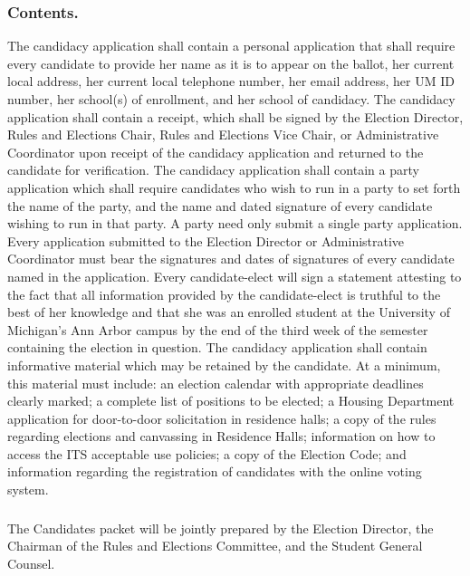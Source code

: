 \subsubsection{Contents.}
The candidacy application shall contain a personal application that shall require every candidate to provide her name as it is to appear on the ballot, her current local address, her current local telephone number, her email address, her UM ID number, her school(s) of enrollment, and her school of candidacy. 
The candidacy application shall contain a receipt, which shall be signed by the Election Director, Rules and Elections Chair, Rules and Elections Vice Chair, or Administrative Coordinator upon receipt of the candidacy application and returned to the candidate for verification.
The candidacy application shall contain a party application which shall require candidates who wish to run in a party to set forth the name of the party, and the name and dated signature of every candidate wishing to run in that party.  A party need only submit a single party application. 
Every application submitted to the Election Director or Administrative Coordinator must bear the signatures and dates of signatures of every candidate named in the application.
Every candidate-elect will sign a statement attesting to the fact that all information provided by the candidate-elect is truthful to the best of her knowledge and that she was an enrolled student at the University of Michigan's Ann Arbor campus by the end of the third week of the semester containing the election in question.
The candidacy application shall contain informative material which may be retained by the candidate.  At a minimum, this material must include: an election calendar with appropriate deadlines clearly marked; a complete list of positions to be elected; a Housing Department application for door-to-door solicitation in residence halls; a copy of the rules regarding elections and canvassing in Residence Halls; information on how to access the ITS acceptable use policies; a copy of the Election Code; and information regarding the registration of candidates with the online voting system.
\subsubsection{}
The Candidates packet will be jointly prepared by the Election Director, the Chairman of the Rules and Elections Committee, and the Student General Counsel.


